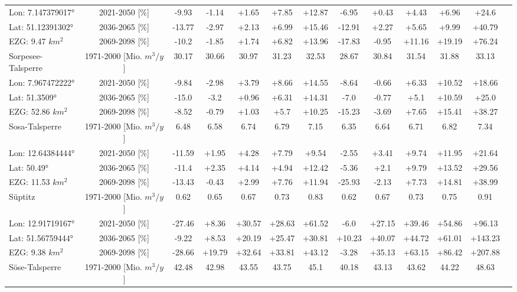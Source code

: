 \begin{longtable}{@{\extracolsep{\fill}}lc|ccccc||cccccc}
\cline{2-13} 
Lon: 7.147379017° & 2021-2050 [\%]  & -9.93 & -1.14 & +1.65 & +7.85 & +12.87 & -6.95 & +0.43 & +4.43 & +6.96 & +24.6 & \\ 
Lat: 51.12391302° & 2036-2065 [\%]  & -13.77 & -2.97 & +2.13 & +6.99 & +15.46 & -12.91 & +2.27 & +5.65 & +9.99 & +40.79 & \\ 
EZG: 9.47 $km^2$ & 2069-2098 [\%]  & -10.2 & -1.85 & +1.74 & +6.82 & +13.96 & -17.83 & -0.95 & +11.16 & +19.19 & +76.24 & \\ 
\hline 
Sorpesee-Talsperre & 1971-2000 [Mio. $m^3/y$]  & 30.17 & 30.66 & 30.97 & 31.23 & 32.53 & 28.67 & 30.84 & 31.54 & 31.88 & 33.13 & \\ 
\cline{2-13} 
Lon: 7.967472222° & 2021-2050 [\%]  & -9.84 & -2.98 & +3.79 & +8.66 & +14.55 & -8.64 & -0.66 & +6.33 & +10.52 & +18.66 & \\ 
Lat: 51.3509° & 2036-2065 [\%]  & -15.0 & -3.2 & +0.96 & +6.31 & +14.31 & -7.0 & -0.77 & +5.1 & +10.59 & +25.0 & \\ 
EZG: 52.86 $km^2$ & 2069-2098 [\%]  & -8.52 & -0.79 & +1.03 & +5.7 & +10.25 & -15.23 & -3.69 & +7.65 & +15.41 & +38.27 & \\ 
\hline 
Sosa-Talsperre & 1971-2000 [Mio. $m^3/y$]  & 6.48 & 6.58 & 6.74 & 6.79 & 7.15 & 6.35 & 6.64 & 6.71 & 6.82 & 7.34 & \\ 
\cline{2-13} 
Lon: 12.64384444° & 2021-2050 [\%]  & -11.59 & +1.95 & +4.28 & +7.79 & +9.54 & -2.55 & +3.41 & +9.74 & +11.95 & +21.64 & \\ 
Lat: 50.49° & 2036-2065 [\%]  & -11.4 & +2.35 & +4.14 & +4.94 & +12.42 & -5.36 & +2.1 & +9.79 & +13.52 & +29.56 & \\ 
EZG: 11.53 $km^2$ & 2069-2098 [\%]  & -13.43 & -0.43 & +2.99 & +7.76 & +11.94 & -25.93 & -2.13 & +7.73 & +14.81 & +38.99 & \\ 
\hline 
Süptitz & 1971-2000 [Mio. $m^3/y$]  & 0.62 & 0.65 & 0.67 & 0.73 & 0.83 & 0.62 & 0.67 & 0.73 & 0.75 & 0.91 & \\ 
\cline{2-13} 
Lon: 12.91719167° & 2021-2050 [\%]  & -27.46 & +8.36 & +30.57 & +28.63 & +61.52 & -6.0 & +27.15 & +39.46 & +54.86 & +96.13 & \\ 
Lat: 51.56759444° & 2036-2065 [\%]  & -9.22 & +8.53 & +20.19 & +25.47 & +30.81 & +10.23 & +40.07 & +44.72 & +61.01 & +143.23 & \\ 
EZG: 9.38 $km^2$ & 2069-2098 [\%]  & -28.66 & +19.79 & +32.64 & +33.81 & +43.12 & -3.28 & +35.13 & +63.15 & +86.42 & +207.88 & \\ 
\hline 
Söse-Talsperre & 1971-2000 [Mio. $m^3/y$]  & 42.48 & 42.98 & 43.55 & 43.75 & 45.1 & 40.18 & 43.13 & 43.62 & 44.22 & 48.63 & \\ 

\end{longtable}
